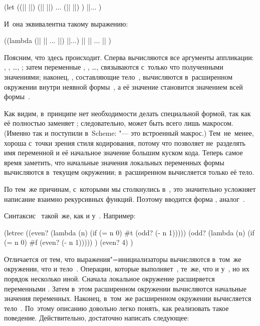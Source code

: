 \begin{code:lisp}
(let ((|| ||)
      (|| ||)
       ...
      (|| ||) )
  ||... )
\end{code:lisp}

\noindent
И~она эквивалентна такому выражению:

\begin{code:lisp}
((lambda (|| || ... ||) ||...)
 || || ... || )
\end{code:lisp}

Поясним, что здесь происходит. Сперва вычисляются все аргументы аппликации:
, , \dots, ;
затем переменные , , \dots,
 связываются с~только что полученными значениями;
наконец, , составляющие тело~, вычисляются в~расширенном
окружении внутри неявной формы~, а её значение становится значением
всей формы~.

Как видим, в~принципе нет необходимости делать  специальной формой, так
как её полностью заменяет ; следовательно,  может быть всего
лишь макросом. (Именно так и поступили в~Scheme:  "--- это встроенный
макрос.) Тем~не~менее,  хороша с~точки зрения стиля кодирования, потому
что позволяет не~разделять имя переменной и её начальное значение большим куском
кода. Теперь самое время заметить, что начальные значения локальных переменных
формы  вычисляются в~текущем окружении; в~расширенном вычисляется только
её тело.

По тем~же причинам, с~которыми мы столкнулись в~, это значительно
усложняет написание взаимно рекурсивных функций. Поэтому вводится форма
, аналог~.

Синтаксис~ такой~же, как и у~. Например:

\begin{code:lisp}
(letrec ((even? (lambda (n) (if (= n 0) #t (odd? (- n 1)))))
         (odd? (lambda (n) (if (= n 0) #f (even? (- n 1))))) )
  (even? 4) )
\end{code:lisp}

Отличается  от  тем, что выражения"=инициализаторы
вычисляются в~том~же окружении, что и тело~. Операции, которые
выполняет~, те~же, что и у~, но их порядок несколько иной.
Сначала локальное окружение расширяется переменными . Затем в~этом
расширенном окружении вычисляются начальные значения переменных. Наконец,
в~том~же расширенном окружении вычисляется тело~. По~этому описанию
довольно легко понять, как реализовать такое поведение. Действительно,
достаточно написать следующее:

